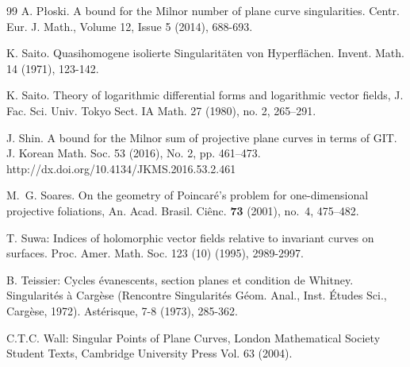 \documentclass[11pt]{amsart}
\begin{document}
\begin{thebibliography}{99}
A. P\l oski. A bound for the Milnor number of plane curve singularities. Centr. Eur. J. Math., Volume 12, Issue 5 (2014), 688-693.


 K. Saito. Quasihomogene isolierte Singularit\"aten von Hyperfl\"achen. Invent. Math. 14 (1971), 123-142.

 K. Saito. Theory of logarithmic differential forms and logarithmic vector fields, J. Fac. Sci. Univ. Tokyo Sect. IA Math. 27 (1980), no. 2, 265–291.

J. Shin. A bound for the Milnor sum of projective plane curves in terms of GIT. J. Korean Math. Soc. 53 (2016), No. 2, pp. 461--473. http://dx.doi.org/10.4134/JKMS.2016.53.2.461

M.~G. Soares. On the geometry of Poincar\'e's problem for one-dimensional projective foliations, An. Acad. Brasil. Ci\^enc. {\bf 73} (2001), no.~4, 475--482.


 T. Suwa: Indices of holomorphic vector fields relative to invariant curves on surfaces. Proc. Amer. Math. Soc. 123 (10) (1995), 2989-2997.



B. Teissier: Cycles \'evanescents, section planes et condition de Whitney.  Singularit\'es \`a Carg\`ese (Rencontre Singularit\'es G\'eom. Anal., Inst. \'Etudes Sci., Carg\`ese, 1972). Ast\'erisque, 7-8 (1973), 285-362.

C.T.C. Wall:  Singular Points of Plane Curves, London Mathematical Society Student Texts, Cambridge University Press Vol. 63
(2004).


\end{thebibliography}
\end{document}
